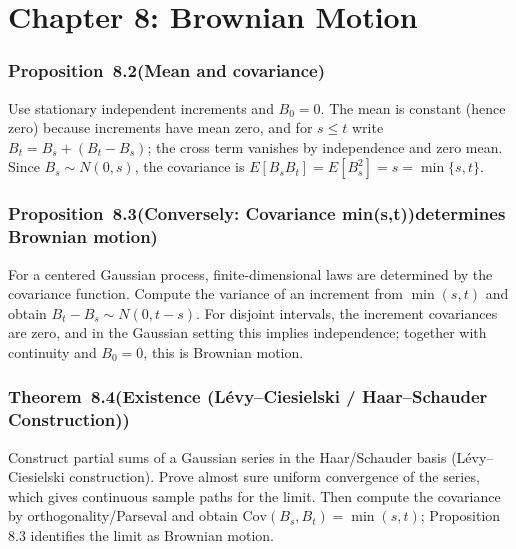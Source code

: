 \documentclass[11pt,a4paper]{article}
\newcommand{\proofcapsule}[4]{%
  \subsubsection*{#1~#2\quad \textnormal{\small(#3)}}%
  #4}
\begin{document}
\section{Chapter 8: Brownian Motion}
\proofcapsule{Proposition}{8.2}{Mean and covariance}{Use stationary independent increments and $B_0=0$. The mean is constant (hence zero) because increments have mean zero, and for $s\le t$ write $B_t=B_s+(B_t-B_s)$; the cross term vanishes by independence and zero mean. Since $B_s\sim N(0,s)$, the covariance is $E[B_sB_t]=E[B_s^2]=s=\min\{s,t\}$.}
\proofcapsule{Proposition}{8.3}{Conversely: Covariance min(s,t))determines Brownian motion}{For a centered Gaussian process, finite-dimensional laws are determined by the covariance function. Compute the variance of an increment from $\min(s,t)$ and obtain $B_t-B_s\sim N(0,t-s)$. For disjoint intervals, the increment covariances are zero, and in the Gaussian setting this implies independence; together with continuity and $B_0=0$, this is Brownian motion.}
\proofcapsule{Theorem}{8.4}{Existence (Lévy--Ciesielski / Haar--Schauder Construction)}{Construct partial sums of a Gaussian series in the Haar/Schauder basis (Lévy--Ciesielski construction). Prove almost sure uniform convergence of the series, which gives continuous sample paths for the limit. Then compute the covariance by orthogonality/Parseval and obtain $\mathrm{Cov}(B_s,B_t)=\min(s,t)$; Proposition 8.3 identifies the limit as Brownian motion.}
\end{document}
